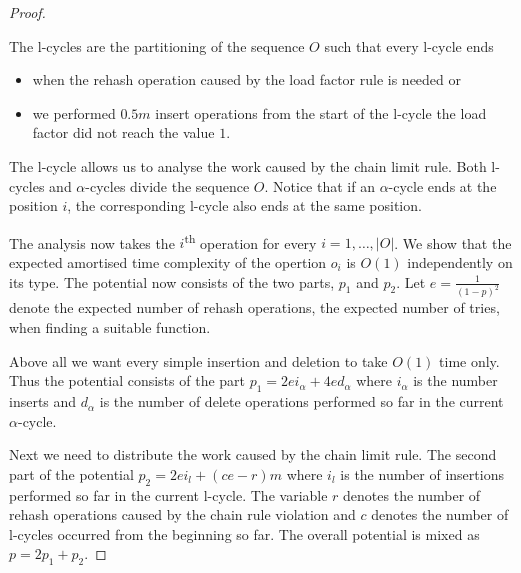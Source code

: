 \begin{proof}
\begin{definition}[l-cycle]
The l-cycles are the partitioning of the sequence $O$ such that every l-cycle ends
\begin{itemize}
\item when the rehash operation caused by the load factor rule is needed or
\item we performed $0.5 m$ insert operations from the start of the l-cycle the load factor did not reach the value $1$.
\end{itemize}
\end{definition}
The l-cycle allows us to analyse the work caused by the chain limit rule. Both l-cycles and $\alpha$-cycles divide the sequence $O$. Notice that if an $\alpha$-cycle ends at the position $i$, the corresponding l-cycle also ends at the same position. 

The analysis now takes the $i$\textsuperscript{th} operation for every $i = 1, \dots, |O|$. We show that the expected amortised time complexity of the opertion $o_i$ is $O(1)$ independently on its type. The potential now consists of the two parts, $p_1$ and $p_2$. Let $e = \frac{1}{(1 - p) ^ 2}$ denote the expected number of rehash operations, the expected number of tries, when finding a suitable function. 

Above all we want every simple insertion and deletion to take $O(1)$ time only. Thus the potential consists of the part $p_1 = 2ei_{\alpha} + 4ed_{\alpha}$ where $i_{\alpha}$ is the number inserts and $d_{\alpha}$ is the number of delete operations performed so far in the current $\alpha$-cycle. 

Next we need to distribute the work caused by the chain limit rule. The second part of the potential $p_2 = 2ei_{l} + (ce - r) m$ where $i_l$ is the number of insertions performed so far in the current l-cycle. The variable $r$ denotes the number of rehash operations caused by the chain rule violation and $c$ denotes the number of l-cycles occurred from the beginning so far. The overall potential is mixed as $p = 2p_1 + p_2$.


\end{proof}
